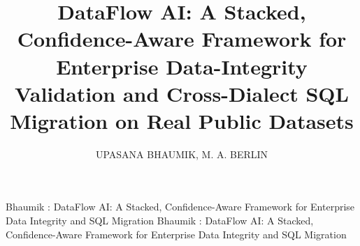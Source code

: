 \documentclass{ieeeaccess}
\begin{document}

\title{DataFlow AI: A Stacked, Confidence-Aware Framework for Enterprise
Data-Integrity Validation and Cross-Dialect SQL Migration on Real Public Datasets}

\author{
  \uppercase{Upasana Bhaumik},
  \uppercase{M. A. Berlin}
}

\address[1,2]{School of Computer Science and Engineering (SCOPE),
Vellore Institute of Technology (VIT), Vellore, Tamil Nadu 632 014, India}

\markboth
{Bhaumik \headeretal: DataFlow AI: A Stacked, Confidence-Aware Framework for Enterprise Data Integrity and SQL Migration}
{Bhaumik \headeretal: DataFlow AI: A Stacked, Confidence-Aware Framework for Enterprise Data Integrity and SQL Migration}

\end{document}
